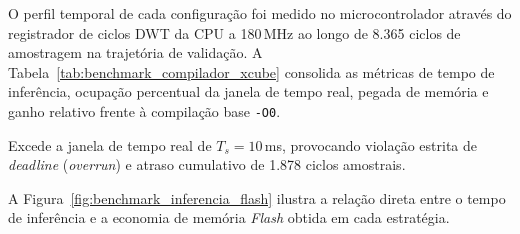 O perfil temporal de cada configuração foi medido no microcontrolador através do registrador de ciclos DWT da CPU a 180\,MHz ao longo de 8.365 ciclos de amostragem na trajetória de validação. A Tabela~\ref{tab:benchmark_compilador_xcube} consolida as métricas de tempo de inferência, ocupação percentual da janela de tempo real, pegada de memória e ganho relativo frente à compilação base \texttt{-O0}.

\begin{table}[H]
    \centering
    \caption{Comparativo de desempenho computacional e pegada de memória.}
    \label{tab:benchmark_compilador_xcube}
    \small
    \par\vspace{1ex}
    {\raggedright \footnotesize * Excede a janela de tempo real de $T_s = 10$\,ms, provocando violação estrita de \textit{deadline} (\textit{overrun}) e atraso cumulativo de 1.878 ciclos amostrais.\par}
    \par\vspace{1.5ex}
\end{table}

A Figura~\ref{fig:benchmark_inferencia_flash} ilustra a relação direta entre o tempo de inferência e a economia de memória \textit{Flash} obtida em cada estratégia.

